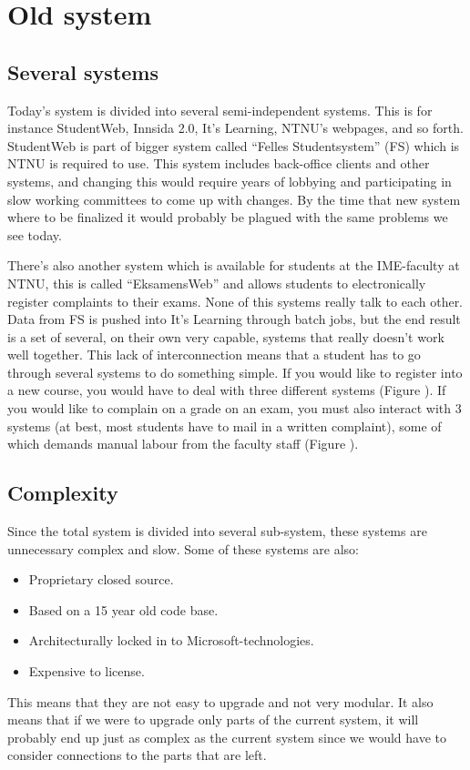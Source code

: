 \section{Old system}
\subsection{Several systems}
Today's system is divided into several semi-independent systems. This is for instance StudentWeb, Innsida 2.0, It's Learning, NTNU's webpages, and so forth. 
StudentWeb is part of bigger system called ``Felles Studentsystem'' (FS) which is NTNU is required to use. This system includes back-office clients and other systems, and changing this
would require years of lobbying and participating in slow working committees to come up with changes. By the time that new system where to be finalized it would probably be plagued with the same problems we see today.

\noindent %
 There's also another system which is available for students at the IME-faculty at NTNU, this is called ``EksamensWeb'' and allows students to electronically register complaints to 
 their exams. None of this systems really talk to each other. Data from FS is pushed into It's Learning through batch jobs, but the end result is a set of several, on their own very capable, systems that really doesn't work well together.  
 This lack of interconnection means that a student has to go through several systems to do something simple. If you would like to register into a new course, you would have to deal with three different systems (Figure \pageref{fig:Register-old}). If you would like to complain on a grade on an exam, you must also interact with 3 systems (at best, most students have to mail in a written complaint), some of which demands manual labour from the faculty staff (Figure \pageref{fig:Complain-old}).

\subsection{Complexity}Since the total system is divided into several sub-system, these systems are unnecessary complex and slow. Some of these systems are also:
\begin{itemize}
\item Proprietary closed source.
\item Based on a 15 year old code base.
\item Architecturally locked in to Microsoft-technologies.
\item Expensive to license.
\end{itemize}
This means that they are not easy to upgrade and not very modular. It also means that if we were to upgrade only parts of the current system, it will probably end up just as complex 
as the current system since we would have to consider connections to the parts that are left.


